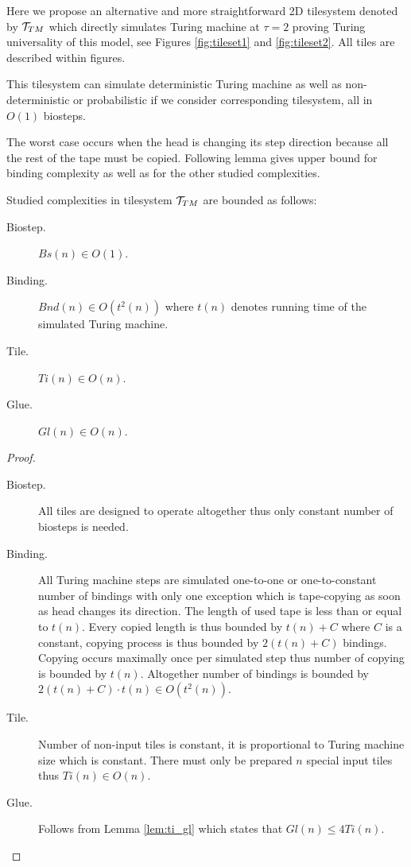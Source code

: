 	Here we propose an alternative and more straightforward 2D tilesystem denoted by ${\cal T}_{TM}$ which directly simulates Turing machine at $\tau=2$ proving Turing universality of this model, see Figures \ref{fig:tileset1} and \ref{fig:tileset2}. All tiles are described within figures.
	\begin{remark}
		This tilesystem can simulate deterministic Turing machine as well as non-deter\-ministic or probabilistic if we consider corresponding tilesystem, all in $O(1)$ biosteps.
	\end{remark}
	The worst case occurs when the head is changing its step direction because all the rest of the tape must be copied. Following lemma gives upper bound for binding complexity as well as for the other studied complexities.
	\begin{lemma}
	\label{lem:TM_bound}
		Studied complexities in tilesystem ${\cal T}_{TM}$ are bounded as follows:
		\begin{description}
			\item[Biostep.] $Bs(n) \in O(1)$.
			\item[Binding.] $Bnd(n) \in O(t^2(n))$ where $t(n)$ denotes running time of the simulated Turing machine.
			\item[Tile.] $Ti(n) \in O(n)$.
			\item[Glue.] $Gl(n) \in O(n)$.
		\end{description}
	\end{lemma}
	\begin{proof}
		~
		\begin{description}
			\item[Biostep.] All tiles are designed to operate altogether thus only constant number of biosteps is needed.
			\item[Binding.] All Turing machine steps are simulated one-to-one or one-to-constant number of bindings with only one exception which is tape-copying as soon as head changes its direction. The length of %
			used tape is less than or equal to $t(n)$. Every copied length is thus bounded by $t(n) + C$ where $C$ is a constant, copying process is thus bounded by $2(t(n)+C)$ bindings. Copying occurs maximally once per simulated step thus number of copying is bounded by $t(n)$. Altogether number of bindings is bounded by $2(t(n)+C)\cdot t(n) \in O(t^2(n))$.
			\item[Tile.] Number of non-input tiles is constant, it is proportional to Turing machine size which is constant. There must only be prepared $n$ special input tiles thus $Ti(n) \in O(n)$.
			\item[Glue.] Follows from Lemma \ref{lem:ti_gl} which states that $Gl(n) \leq 4Ti(n)$.
		\end{description}
	\end{proof}
